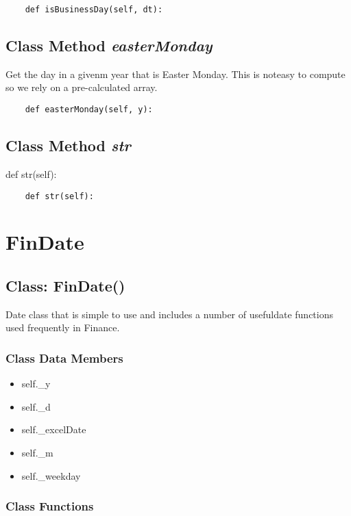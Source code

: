 \documentclass[twoside,11pt]{book}
\begin{document}
\begin{lstlisting}
    def isBusinessDay(self, dt):
\end{lstlisting}

\subsection{Class Method {\it easterMonday}}
Get the day in a givenm year that is Easter Monday. This is noteasy to compute so we rely on a pre-calculated array. 

\begin{lstlisting}
    def easterMonday(self, y):
\end{lstlisting}

\subsection{Class Method {\it str}}
def str(self):

\begin{lstlisting}
    def str(self):
\end{lstlisting}

\newpage
\section{FinDate}

\subsection{Class: FinDate()}
Date class that is simple to use and includes a number of usefuldate functions used frequently in Finance. 

\subsubsection{Class Data Members}
\begin{itemize}
\item{self.\_y}
\item{self.\_d}
\item{self.\_excelDate}
\item{self.\_m}
\item{self.\_weekday}
\end{itemize}

\subsubsection{Class Functions}
\end{document}

